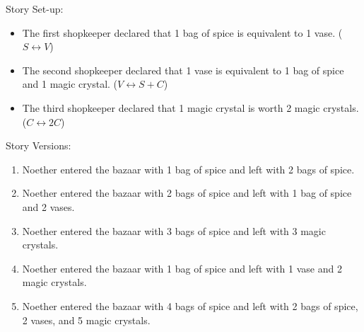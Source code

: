Story Set-up:
\begin{itemize}
\item The first shopkeeper declared that 1 bag of spice is equivalent to 1 vase. (\(S \leftrightarrow V\))
\item The second shopkeeper declared that 1 vase is equivalent to 1 bag of spice and 1 magic crystal. (\(V \leftrightarrow S + C\))
\item The third shopkeeper declared that 1 magic crystal is worth 2 magic crystals. (\(C \leftrightarrow 2C\))
\end{itemize}

Story Versions:
\begin{enumerate}
\item Noether entered the bazaar with 1 bag of spice and left with 2 bags of spice.
\item Noether entered the bazaar with 2 bags of spice and left with 1 bag of spice and 2 vases.
\item Noether entered the bazaar with 3 bags of spice and left with 3 magic crystals.
\item Noether entered the bazaar with 1 bag of spice and left with 1 vase and 2 magic crystals.
\item Noether entered the bazaar with 4 bags of spice and left with 2 bags of spice, 2 vases, and 5 magic crystals.
\end{enumerate}
